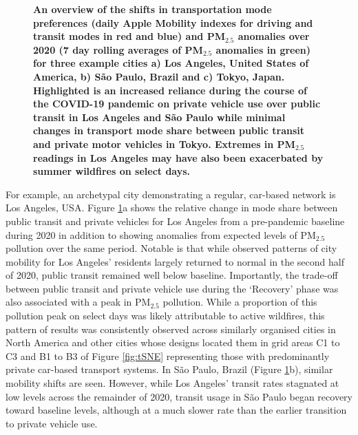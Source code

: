 \documentclass[preprint,10pt]{elsarticle} %
\begin{document}
\begin{figure}
         \label{fig:Tokyo}
        \caption{\bf An overview of the shifts in transportation mode preferences (daily Apple Mobility indexes for driving and transit modes in red and blue) and PM$_{2.5}$ anomalies over 2020 (7 day rolling averages of PM$_{2.5}$ anomalies in green) for three example cities a) Los Angeles, United States of America, b) S\~ao Paulo, Brazil and c) Tokyo, Japan. Highlighted is an increased reliance during the course of the COVID-19 pandemic on private vehicle use over public transit in Los Angeles and S\~ao Paulo while minimal changes in transport mode share between public transit and private motor vehicles in Tokyo. Extremes in PM$_{2.5}$ readings in Los Angeles may have also been exacerbated by summer wildfires on select days.}
        \label{fig:three_graphs_Driv_trans}
\end{figure}

For example, an archetypal city demonstrating a regular, car-based network is Los Angeles, USA. Figure \ref{fig:three_graphs_Driv_trans}a shows the relative change in mode share between public transit and private vehicles for Los Angeles from a pre-pandemic baseline during 2020 in addition to showing anomalies from expected levels of PM$_{2.5}$ pollution over the same period. Notable is that while observed patterns of city mobility for Los Angeles' residents largely returned to normal in the second half of 2020, public transit remained well below baseline. Importantly, the trade-off between public transit and private vehicle use during the `Recovery' phase was also associated with a peak in PM$_{2.5}$ pollution. While a proportion of this pollution peak on select days was likely attributable to active wildfires, this pattern of results was consistently observed across similarly organised cities in North America and other cities whose designs located them in grid areas C1 to C3 and B1 to B3 of Figure \ref{fig:tSNE} representing those with predominantly private car-based transport systems. In S\~ao Paulo, Brazil (Figure \ref{fig:three_graphs_Driv_trans}b), similar mobility shifts are seen. However, while Los Angeles' transit rates stagnated at low levels across the remainder of 2020, transit usage in S\~ao Paulo began recovery toward baseline levels, although at a much slower rate than the earlier transition to private vehicle use.
\end{document}
